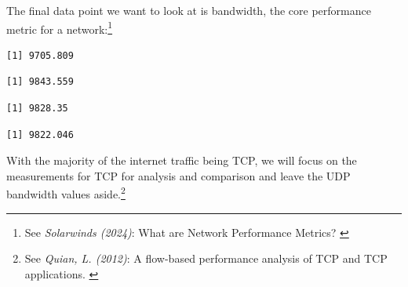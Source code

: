 The final data point we want to look at is bandwidth, the core
performance metric for a network:\footnote{See \textit{Solarwinds (2024)}: What are Network Performance Metrics? \cite{networkPerformance}}

\begin{Shaded}
\begin{Highlighting}[]
\SpecialCharTok{\$}
\end{Highlighting}
\end{Shaded}

\begin{verbatim}
[1] 9705.809
\end{verbatim}

\begin{Shaded}
\begin{Highlighting}[]
\SpecialCharTok{\$}
\end{Highlighting}
\end{Shaded}

\begin{verbatim}
[1] 9843.559
\end{verbatim}

\begin{Shaded}
\begin{Highlighting}[]
\SpecialCharTok{\$}
\end{Highlighting}
\end{Shaded}

\begin{verbatim}
[1] 9828.35
\end{verbatim}

\begin{Shaded}
\begin{Highlighting}[]
\SpecialCharTok{\$}
\end{Highlighting}
\end{Shaded}

\begin{verbatim}
[1] 9822.046
\end{verbatim}

With the majority of the internet traffic being TCP, we will focus on
the measurements for TCP for analysis and comparison and leave the UDP bandwidth values aside.\footnote{See \textit{Quian, L. (2012)}: A flow-based performance analysis of TCP and TCP applications. \cite{tcpTraffic}}

